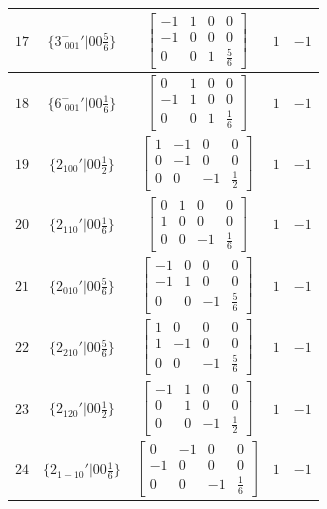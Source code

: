 \documentclass[fleqn,8pt]{jsarticle}
\begin{document}
\begin{longtable}{ccccc}
$ 17 $ & $ \{3^{-}_{\,\,001}{}'|0 0 \frac{5}{6}\} $ & $ \begin{bmatrix} -1 & 1 & 0 & 0 \\ -1 & 0 & 0 & 0 \\ 0 & 0 & 1 & \frac{5}{6} \end{bmatrix} $ & $ 1 $ & $ -1 $ \\ \hline
$ 18 $ & $ \{6^{-}_{\,\,001}{}'|0 0 \frac{1}{6}\} $ & $ \begin{bmatrix} 0 & 1 & 0 & 0 \\ -1 & 1 & 0 & 0 \\ 0 & 0 & 1 & \frac{1}{6} \end{bmatrix} $ & $ 1 $ & $ -1 $ \\ \hline
$ 19 $ & $ \{2{}_{100}{}'|0 0 \frac{1}{2}\} $ & $ \begin{bmatrix} 1 & -1 & 0 & 0 \\ 0 & -1 & 0 & 0 \\ 0 & 0 & -1 & \frac{1}{2} \end{bmatrix} $ & $ 1 $ & $ -1 $ \\ \hline
$ 20 $ & $ \{2{}_{110}{}'|0 0 \frac{1}{6}\} $ & $ \begin{bmatrix} 0 & 1 & 0 & 0 \\ 1 & 0 & 0 & 0 \\ 0 & 0 & -1 & \frac{1}{6} \end{bmatrix} $ & $ 1 $ & $ -1 $ \\ \hline
$ 21 $ & $ \{2{}_{010}{}'|0 0 \frac{5}{6}\} $ & $ \begin{bmatrix} -1 & 0 & 0 & 0 \\ -1 & 1 & 0 & 0 \\ 0 & 0 & -1 & \frac{5}{6} \end{bmatrix} $ & $ 1 $ & $ -1 $ \\ \hline
$ 22 $ & $ \{2{}_{210}{}'|0 0 \frac{5}{6}\} $ & $ \begin{bmatrix} 1 & 0 & 0 & 0 \\ 1 & -1 & 0 & 0 \\ 0 & 0 & -1 & \frac{5}{6} \end{bmatrix} $ & $ 1 $ & $ -1 $ \\ \hline
$ 23 $ & $ \{2{}_{120}{}'|0 0 \frac{1}{2}\} $ & $ \begin{bmatrix} -1 & 1 & 0 & 0 \\ 0 & 1 & 0 & 0 \\ 0 & 0 & -1 & \frac{1}{2} \end{bmatrix} $ & $ 1 $ & $ -1 $ \\ \hline
$ 24 $ & $ \{2{}_{1-10}{}'|0 0 \frac{1}{6}\} $ & $ \begin{bmatrix} 0 & -1 & 0 & 0 \\ -1 & 0 & 0 & 0 \\ 0 & 0 & -1 & \frac{1}{6} \end{bmatrix} $ & $ 1 $ & $ -1 $ \\
\end{longtable}
\end{document}
